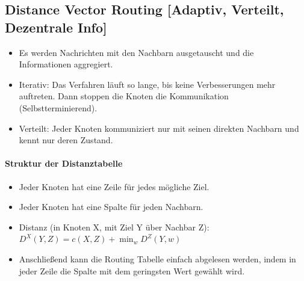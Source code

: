 \documentclass[a4paper, 11pt, accentcolor = tud3b]{tudreport}
\begin{document}
            \subsection{Distance Vector Routing [Adaptiv, Verteilt, Dezentrale Info]}
                \begin{itemize}
                	\item Es werden Nachrichten mit den Nachbarn ausgetauscht und die Informationen aggregiert.
                	\item Iterativ: Das Verfahren läuft so lange, bis keine Verbesserungen mehr auftreten. Dann stoppen die Knoten die Kommunikation (Selbstterminierend).
                	\item Verteilt: Jeder Knoten kommuniziert nur mit seinen direkten Nachbarn und kennt nur deren Zustand.
                \end{itemize}
                
                \paragraph{Struktur der Distanztabelle}
	                \begin{itemize}
	                	\item Jeder Knoten hat eine Zeile für jedes mögliche Ziel.
	                	\item Jeder Knoten hat eine Spalte für jeden Nachbarn.
	                	\item Distanz (in Knoten X, mit Ziel Y über Nachbar Z): \( D ^ X (Y, Z) = c(X, Z) + \min _ w { D ^ Z (Y, w) } \)
	                	\item Anschließend kann die Routing Tabelle einfach abgelesen werden, indem in jeder Zeile die Spalte mit dem geringsten Wert gewählt wird.
	                \end{itemize}
                
\end{document}
